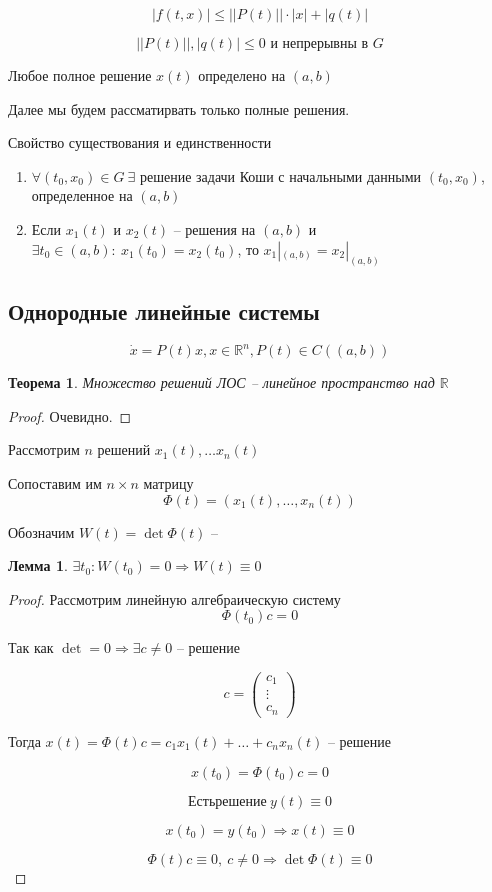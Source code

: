 \documentclass[a4paper]{article}
\theoremstyle{indented}
\newtheorem*{theorem}{Теорема}
\newtheorem*{lemma}{Лемма}
\theoremstyle{definition}
\theoremstyle{remark}
\begin{document}
\[|f(t,x)| \leqslant ||P(t)|| \cdot |x| + |q(t)|\]

\[||P(t)||, |q(t)| \leqslant 0 \text{ и непрерывны в $G$}\]

Любое полное решение $x(t)$ определено на $(a,b)$


Далее мы будем рассматирвать только полные решения.

\begin{center}
  Свойство существования и единственности
\end{center}

\begin{enumerate}
\item $\forall (t_0,x_0) \in G \ \exists$ решение задачи Коши с начальными данными $(t_0,x_0)$, определенное на $(a,b)$
\item Если $x_1(t)$ и $x_2(t)$ -- решения на $(a,b)$ и $\exists t_0 \in  (a,b): \ x_1(t_0) = x_2(t_0)$, то $x_1|_{(a,b)} = x_2|_{(a,b)}$
\end{enumerate}

\subsection{Однородные линейные системы}

\[\dot x = P(t)x, x \in \mathbb{R}^n, P(t) \in C((a,b))\]

\begin{theorem}
  Множество решений ЛОС -- линейное пространство над $\mathbb{R}$
\end{theorem}
\begin{proof}
  Очевидно.
\end{proof}


Рассмотрим $n$ решений $x_1(t), \ldots x_n(t)$

Сопоставим им $n\times n$ матрицу
\[\Phi(t) = (x_1(t), \ldots, x_n(t))\]

Обозначим $W(t) = \det \Phi(t)$ -- 

\begin{lemma}
  $\exists t_0 : W(t_0) = 0 \Rightarrow W(t) \equiv 0 $
\end{lemma}
\begin{proof}
  Рассмотрим линейную алгебраическую систему
  \[\Phi(t_0) c = 0\]

  Так как $\det = 0 \Rightarrow \exists c \neq 0$ -- решение

  \[c = \begin{pmatrix}
      c_1\\
      \vdots\\
      c_n
    \end{pmatrix}\]

  Тогда $x(t) = \Phi(t) c = c_1 x_1(t) + \ldots + c_n x_n(t)$ -- решение

  \[x(t_0) = \Phi(t_0) c = 0\]

  \[Есть решение \ y(t) \equiv 0\]

  \[x(t_0) = y(t_0) \Rightarrow x(t) \equiv 0\]

  \[\Phi(t) c \equiv 0, \ c \neq 0 \Rightarrow \det \Phi(t) \equiv 0\]
\end{proof}
\end{document}
